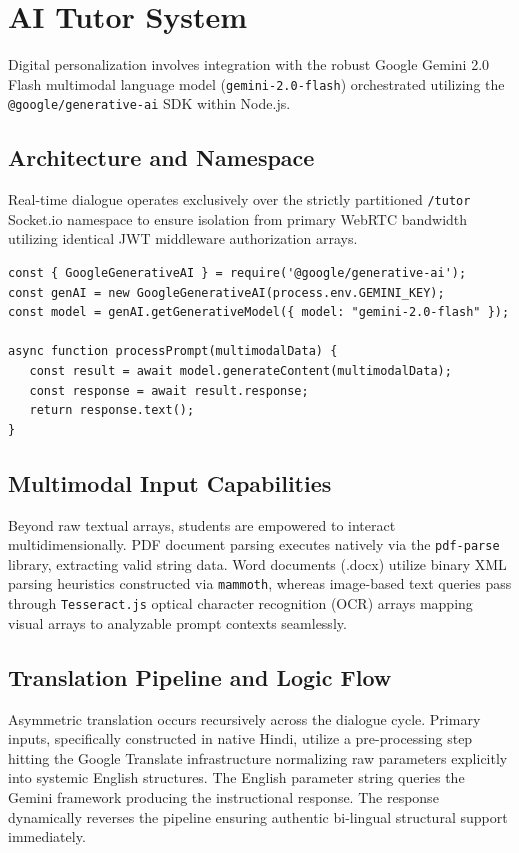 \documentclass[12pt, journal, onecolumn]{IEEEtran}
\begin{document}
\section{AI Tutor System}
Digital personalization involves integration with the robust Google Gemini 2.0 Flash multimodal language model (\texttt{gemini-2.0-flash}) orchestrated utilizing the \texttt{@google/generative-ai} SDK within Node.js.

\subsection{Architecture and Namespace}
Real-time dialogue operates exclusively over the strictly partitioned \texttt{/tutor} Socket.io namespace to ensure isolation from primary WebRTC bandwidth utilizing identical JWT middleware authorization arrays.

\begin{lstlisting}[caption=Gemini 2.0 Promisified Integration]
const { GoogleGenerativeAI } = require('@google/generative-ai');
const genAI = new GoogleGenerativeAI(process.env.GEMINI_KEY);
const model = genAI.getGenerativeModel({ model: "gemini-2.0-flash" });

async function processPrompt(multimodalData) {
   const result = await model.generateContent(multimodalData);
   const response = await result.response;
   return response.text();
}
\end{lstlisting}

\subsection{Multimodal Input Capabilities}
Beyond raw textual arrays, students are empowered to interact multidimensionally. PDF document parsing executes natively via the \texttt{pdf-parse} library, extracting valid string data. Word documents (.docx) utilize binary XML parsing heuristics constructed via \texttt{mammoth}, whereas image-based text queries pass through \texttt{Tesseract.js} optical character recognition (OCR) arrays mapping visual arrays to analyzable prompt contexts seamlessly.

\subsection{Translation Pipeline and Logic Flow}
Asymmetric translation occurs recursively across the dialogue cycle. Primary inputs, specifically constructed in native Hindi, utilize a pre-processing step hitting the Google Translate infrastructure normalizing raw parameters explicitly into systemic English structures. The English parameter string queries the Gemini framework producing the instructional response. The response dynamically reverses the pipeline ensuring authentic bi-lingual structural support immediately.
\end{document}
